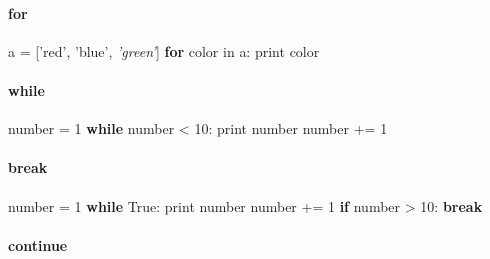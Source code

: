 \documentclass[10pt,a4paperpaper,twocolumn]{article}
\newenvironment{Shaded}{}{}
\newcommand{\DecValTok}[1]{\textcolor[rgb]{0.25,0.63,0.44}{{#1}}}
\newcommand{\StringTok}[1]{\textcolor[rgb]{0.25,0.44,0.63}{{#1}}}
\newcommand{\CommentTok}[1]{\textcolor[rgb]{0.38,0.63,0.69}{\textit{{#1}}}}
\newcommand{\VariableTok}[1]{\textcolor[rgb]{0.10,0.09,0.49}{{#1}}}
\newcommand{\ControlFlowTok}[1]{\textcolor[rgb]{0.00,0.44,0.13}{\textbf{{#1}}}}
\newcommand{\OperatorTok}[1]{\textcolor[rgb]{0.40,0.40,0.40}{{#1}}}
\newcommand{\BuiltInTok}[1]{{#1}}
\newcommand{\NormalTok}[1]{{#1}}
\let\oldparagraph\paragraph
\renewcommand{\paragraph}[1]{\oldparagraph{#1}\mbox{}}
\begin{document}
\hypertarget{for}{\paragraph{for}\label{for}}

\begin{Shaded}
\begin{Highlighting}[]
\NormalTok{a }\OperatorTok{=} \NormalTok{[}\StringTok{'red'}\NormalTok{, }\StringTok{'blue'}\NormalTok{,}
     \CommentTok{'green'}\NormalTok{]}
\ControlFlowTok{for} \NormalTok{color }\OperatorTok{in} \NormalTok{a:}
    \BuiltInTok{print} \NormalTok{color}
\end{Highlighting}
\end{Shaded}

\hypertarget{while}{\paragraph{while}\label{while}}

\begin{Shaded}
\begin{Highlighting}[]
\NormalTok{number }\OperatorTok{=} \DecValTok{1}
\ControlFlowTok{while} \NormalTok{number }\OperatorTok{<} \DecValTok{10}\NormalTok{:}
    \BuiltInTok{print} \NormalTok{number}
    \NormalTok{number }\OperatorTok{+=} \DecValTok{1}
\end{Highlighting}
\end{Shaded}

\hypertarget{break}{\paragraph{break}\label{break}}

\begin{Shaded}
\begin{Highlighting}[]
\NormalTok{number }\OperatorTok{=} \DecValTok{1}
\ControlFlowTok{while} \VariableTok{True}\NormalTok{:}
    \BuiltInTok{print} \NormalTok{number}
    \NormalTok{number }\OperatorTok{+=} \DecValTok{1}
    \ControlFlowTok{if} \NormalTok{number }\OperatorTok{>} \DecValTok{10}\NormalTok{:}
        \ControlFlowTok{break}
\end{Highlighting}
\end{Shaded}

\hypertarget{continue}{\paragraph{continue}\label{continue}}
\end{document}
